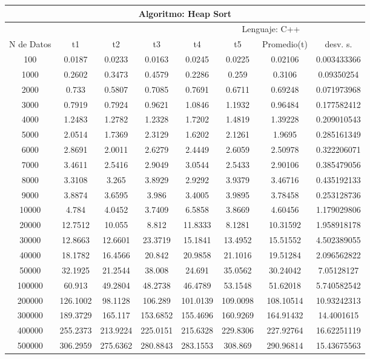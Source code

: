 \documentclass{article}
\begin{document}
            \begin{table}[]
        \begin{tabular}{|c|c|c|c|c|c|c|c| }
            \hline
            \multicolumn{8}{|c|}{Algoritmo: Heap Sort} \\ \hline
            \multicolumn{4}{|c|}{} & \multicolumn{4}{c|}{Lenguaje: C++} \\ \hline
              N de Datos &     t1    &  t2         &  t3          &   t4        &    t5     &   Promedio(t)       & desv. s. \\ \hline
                 100	&0.0187	&0.0233	&0.0163	&0.0245	&0.0225	&0.02106	&0.003433366\\ \hline
                1000	&0.2602	&0.3473	&0.4579	&0.2286	&0.259	&0.3106	&0.09350254\\ \hline
                2000	&0.733	&0.5807	&0.7085	&0.7691	&0.6711	&0.69248	&0.071973968\\ \hline
                3000	&0.7919	&0.7924	&0.9621	&1.0846	&1.1932	&0.96484	&0.177582412\\ \hline
                4000	&1.2483	&1.2782	&1.2328	&1.7202	&1.4819	&1.39228	&0.209010543\\ \hline
                5000	&2.0514	&1.7369	&2.3129	&1.6202	&2.1261	&1.9695	&0.285161349\\ \hline
                6000	&2.8691	&2.0011	&2.6279	&2.4449	&2.6059	&2.50978	&0.322206071\\ \hline
                7000	&3.4611	&2.5416	&2.9049	&3.0544	&2.5433	&2.90106	&0.385479056\\ \hline
                8000	&3.3108	&3.265	&3.8929	&2.9292	&3.9379	&3.46716	&0.435192133\\ \hline
                9000	&3.8874	&3.6595	&3.986	&3.4005	&3.9895	&3.78458	&0.253128736\\ \hline
                10000	&4.784	&4.0452	&3.7409	&6.5858	&3.8669	&4.60456	&1.179029806\\ \hline
                20000	&12.7512	&10.055	&8.812	&11.8333	&8.1281	&10.31592&	1.958918178\\ \hline
                30000	&12.8663	&12.6601	&23.3719	&15.1841	&13.4952	&15.51552&	4.502389055\\ \hline
                40000	&18.1782	&16.4566	&20.842	&20.9858	&21.1016	&19.51284&	2.096562822\\ \hline
                50000	&32.1925	&21.2544	&38.008	&24.691	&35.0562	&30.24042&	7.05128127\\ \hline
                100000	&60.913	&49.2804	&48.2738	&46.4789	&53.1548	&51.62018&	5.740582542\\ \hline
                200000	&126.1002	&98.1128	&106.289	&101.0139	&109.0098&	108.10514&	10.93242313\\ \hline
                300000	&189.3729	&165.117	&153.6852	&155.4696	&160.9269&	164.91432&	14.4001615\\ \hline
                400000	&255.2373	&213.9224	&225.0151&	215.6328	&229.8306	&227.92764&	16.62251119\\ \hline
                500000	&306.2959	&275.6362	&280.8843&	283.1553	&308.869	&290.96814&	15.43675563\\ \hline


\end{tabular}
\end{table}
\end{document}
